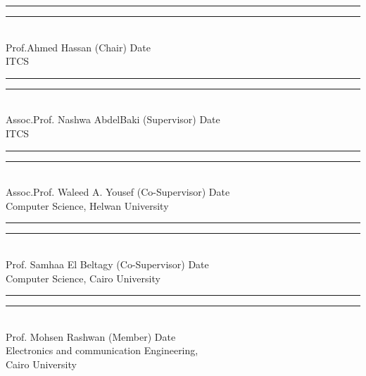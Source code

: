 \hspace{-1.7em}
\rule[0em]{22em}{0.5pt} \hfill \rule[0em]{14em}{0.5pt} \\
\hspace{1em}
Prof.Ahmed Hassan	(Chair)	\hspace{36.7em} Date\\
ITCS \\[1cm]
\hspace{1em}
\rule[0em]{22em}{0.5pt} \hfill \rule[0em]{14em}{0.5pt} \\
\hspace{1em}
Assoc.Prof. Nashwa AbdelBaki (Supervisor)\hspace{29.8em}  Date\\
ITCS \\[1cm]
\hspace{1em}
\hspace{1em}
\rule[0em]{22em}{0.5pt} \hfill \rule[0em]{14em}{0.5pt} \\
\hspace{1em}
Assoc.Prof. Waleed A. Yousef (Co-Supervisor)\hspace{29em}  Date\\
Computer Science, Helwan University\\[1cm]
\hspace{-1.7em}
\rule[0em]{22em}{0.5pt} \hfill \rule[0em]{14em}{0.5pt} \\
\hspace{1em}
Prof. Samhaa El Beltagy	(Co-Supervisor) \hspace{31em} Date\\
Computer Science, Cairo University \\[1cm]
\hspace{1em}
\rule[0em]{22em}{0.5pt} \hfill \rule[0em]{14em}{0.5pt} \\
\hspace{1em}
Prof. Mohsen Rashwan	(Member)\hspace{34.1em} Date\\
Electronics and communication Engineering,\\ Cairo University \\[1cm]


\normalsize{}
\newpage 
{} 

\renewcommand{\contentsname}{\uppercase{Table of Contents}}



